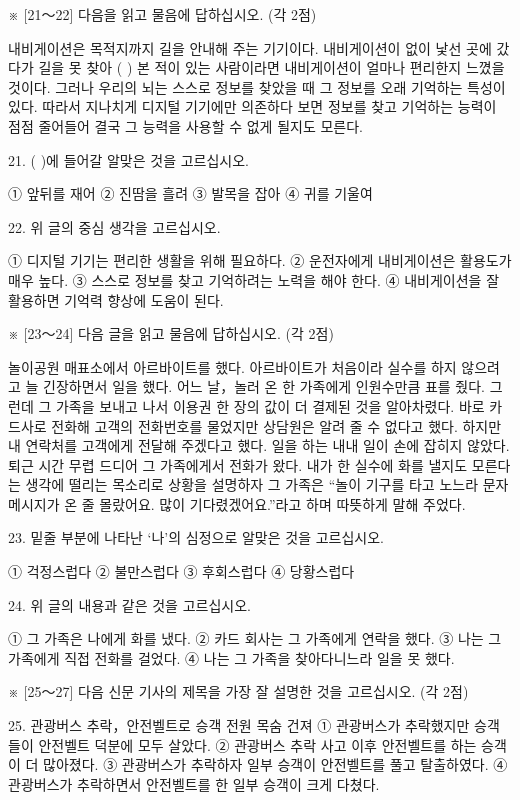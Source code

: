 \documentclass[12pt]{article}
\begin{document}
\begin{enumerate}[1.]
※ [21～22] 다음을 읽고 물음에 답하십시오. (각 2점)

  내비게이션은 목적지까지 길을 안내해 주는 기기이다. 내비게이션이
없이 낯선 곳에 갔다가 길을 못 찾아 (    ) 본 적이 있는
사람이라면 내비게이션이 얼마나 편리한지 느꼈을 것이다. 그러나 우리의
뇌는 스스로 정보를 찾았을 때 그 정보를 오래 기억하는 특성이 있다.
따라서 지나치게 디지털 기기에만 의존하다 보면 정보를 찾고 기억하는
능력이 점점 줄어들어 결국 그 능력을 사용할 수 없게 될지도 모른다.


21. (   )에 들어갈 알맞은 것을 고르십시오.

① 앞뒤를 재어
② 진땀을 흘려
③ 발목을 잡아
④ 귀를 기울여


22. 위 글의 중심 생각을 고르십시오.

① 디지털 기기는 편리한 생활을 위해 필요하다.
② 운전자에게 내비게이션은 활용도가 매우 높다.
③ 스스로 정보를 찾고 기억하려는 노력을 해야 한다.
④ 내비게이션을 잘 활용하면 기억력 향상에 도움이 된다.




※ [23～24] 다음 글을 읽고 물음에 답하십시오. (각 2점)

  놀이공원 매표소에서 아르바이트를 했다. 아르바이트가 처음이라 실수를
하지 않으려고 늘 긴장하면서 일을 했다. 어느 날，놀러 온 한 가족에게
인원수만큼 표를 줬다. 그런데 그 가족을 보내고 나서 이용권 한 장의 값이
더 결제된 것을 알아차렸다. 바로 카드사로 전화해 고객의 전화번호를
물었지만 상담원은 알려 줄 수 없다고 했다. 하지만 내 연락처를 고객에게
전달해 주겠다고 했다. 일을 하는 내내 일이 손에 잡히지 않았다. 퇴근
시간 무렵 드디어 그 가족에게서 전화가 왔다. 내가 한 실수에 화를 낼지도
모른다는 생각에 떨리는 목소리로 상황을 설명하자 그 가족은 “놀이 기구를
타고 노느라 문자 메시지가 온 줄 몰랐어요. 많이 기다렸겠어요.”라고 하며
따뜻하게 말해 주었다.


23. 밑줄 부분에 나타난 ‘나’의 심정으로 알맞은 것을 고르십시오.

① 걱정스럽다
② 불만스럽다
③ 후회스럽다
④ 당황스럽다


24. 위 글의 내용과 같은 것을 고르십시오.

① 그 가족은 나에게 화를 냈다.
② 카드 회사는 그 가족에게 연락을 했다.
③ 나는 그 가족에게 직접 전화를 걸었다.
④ 나는 그 가족을 찾아다니느라 일을 못 했다.




※ [25～27] 다음 신문 기사의 제목을 가장 잘 설명한 것을 고르십시오. (각 2점)

25.
관광버스 추락，안전벨트로 승객 전원 목숨 건져
① 관광버스가 추락했지만 승객들이 안전벨트 덕분에 모두 살았다.
② 관광버스 추락 사고 이후 안전벨트를 하는 승객이 더 많아졌다.
③ 관광버스가 추락하자 일부 승객이 안전벨트를 풀고 탈출하였다.
④ 관광버스가 추락하면서 안전벨트를 한 일부 승객이 크게 다쳤다.



\end{enumerate}
\end{document}
